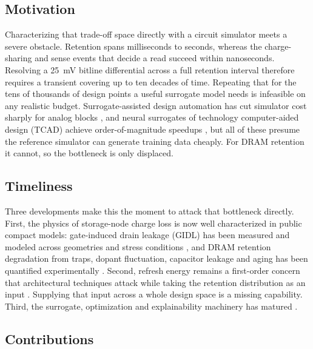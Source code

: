 \documentclass[11pt,a4paper]{article}
\begin{document}
\subsection{Motivation}

Characterizing that trade-off space directly with a circuit simulator meets a
severe obstacle. Retention spans milliseconds to seconds, whereas the
charge-sharing and sense events that decide a read succeed within nanoseconds.
Resolving a \SI{25}{\milli\volt} bitline differential across a full retention
interval therefore requires a transient covering up to ten decades of time.
Repeating that for the tens of thousands of design points a useful surrogate
model needs is infeasible on any realistic budget. Surrogate-assisted design
automation has cut simulator cost sharply for analog blocks
\cite{budak2022sizing,rashid2024global,yin2023surrogate,huang2021mleda}, and
neural surrogates of technology computer-aided design (TCAD) achieve
order-of-magnitude speedups \cite{jang2023gnn,wang2023tcadcal,li2025devmodel,
liu2025sann}, but all of these presume the reference simulator can generate
training data cheaply. For DRAM retention it cannot, so the bottleneck is only
displaced.

\subsection{Timeliness}

Three developments make this the moment to attack that bottleneck directly.
First, the physics of storage-node charge loss is now well characterized in public
compact models: gate-induced drain leakage (GIDL) has been measured and modeled
across geometries and stress conditions \cite{maniyar2022sidewall,lee2022stress,
thakur2023gidl,kaushal2022ncfinfet,bashir2024btbt,kwak2024gidl}, and DRAM
retention degradation from traps, dopant fluctuation, capacitor leakage and
aging has been quantified experimentally \cite{kim2021trap,kim2021rdf,
bepary2022aging,park2025capleak}. Second, refresh energy remains a first-order
concern that architectural techniques attack while taking the retention
distribution as an input \cite{du2025crdram,golman2021refresh,nguyen2021zem,
gupta2021tfet}. Supplying that input across a whole design space is a missing
capability. Third, the surrogate, optimization and explainability machinery has
matured \cite{zhang2022batchbo,touloupas2022locomobo,chen2022highdimbo,
saglican2023moead,abdollahi2024xai,homafar2022shap}.

\subsection{Contributions}
\end{document}
